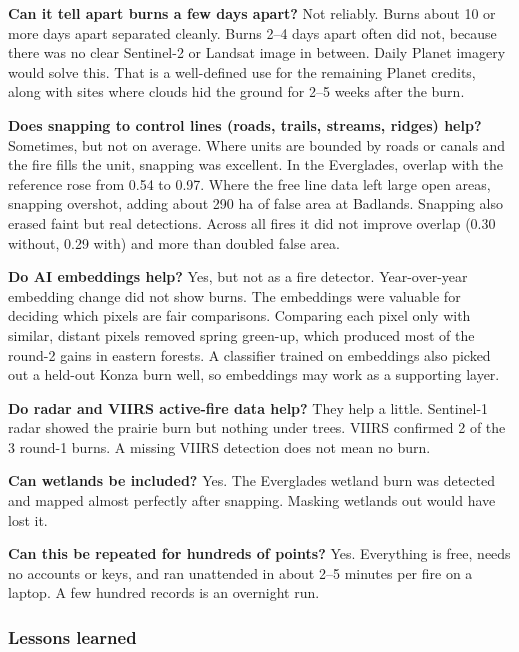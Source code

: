 \documentclass[
]{article}
\begin{document}
\textbf{Can it tell apart burns a few days apart?} Not reliably. Burns
about 10 or more days apart separated cleanly. Burns 2--4 days apart
often did not, because there was no clear Sentinel-2 or Landsat image in
between. Daily Planet imagery would solve this. That is a well-defined
use for the remaining Planet credits, along with sites where clouds hid
the ground for 2--5 weeks after the burn.

\textbf{Does snapping to control lines (roads, trails, streams, ridges)
help?} Sometimes, but not on average. Where units are bounded by roads
or canals and the fire fills the unit, snapping was excellent. In the
Everglades, overlap with the reference rose from 0.54 to 0.97. Where the
free line data left large open areas, snapping overshot, adding about
290 ha of false area at Badlands. Snapping also erased faint but real
detections. Across all fires it did not improve overlap (0.30 without,
0.29 with) and more than doubled false area.

\textbf{Do AI embeddings help?} Yes, but not as a fire detector.
Year-over-year embedding change did not show burns. The embeddings were
valuable for deciding which pixels are fair comparisons. Comparing each
pixel only with similar, distant pixels removed spring green-up, which
produced most of the round-2 gains in eastern forests. A classifier
trained on embeddings also picked out a held-out Konza burn well, so
embeddings may work as a supporting layer.

\textbf{Do radar and VIIRS active-fire data help?} They help a little.
Sentinel-1 radar showed the prairie burn but nothing under trees. VIIRS
confirmed 2 of the 3 round-1 burns. A missing VIIRS detection does not
mean no burn.

\textbf{Can wetlands be included?} Yes. The Everglades wetland burn was
detected and mapped almost perfectly after snapping. Masking wetlands
out would have lost it.

\textbf{Can this be repeated for hundreds of points?} Yes. Everything is
free, needs no accounts or keys, and ran unattended in about 2--5
minutes per fire on a laptop. A few hundred records is an overnight run.

\subsubsection{Lessons learned}\label{lessons-learned}
\end{document}
